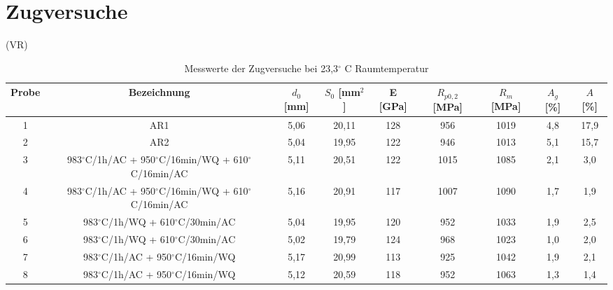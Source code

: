 \chapter{Zugversuche }

(VR)




\begin{table}
	\centering
	\begin{tabular}{|c|c|c|c|c|c|c|c|c|}
		\hline
		Probe & Bezeichnung & $d_0$ [mm] & $S_0$ [mm$^2$] & E [GPa] & $R_{p0,2}$ [MPa]& $R_m$ [MPa]& $A_g$ [\%]& $A$ [\%]\\
		\hline
		1 & AR1 & 5,06 & 20,11 & 128 & 956 & 1019&4,8&17,9 \\
		\hline
		2 & AR2&5,04&19,95&122&946&1013&5,1&15,7\\
		\hline
		3 & 983$^\circ$C/1h/AC + 950$^\circ$C/16min/WQ + 610$^\circ$C/16min/AC& 5,11&20,51& 122&1015&1085&2,1&3,0\\
		\hline
		4 & 983$^\circ$C/1h/AC + 950$^\circ$C/16min/WQ + 610$^\circ$C/16min/AC&5,16& 20,91& 117 & 1007& 1090& 1,7&  1,9 \\
		\hline
		5 & 983$^\circ$C/1h/WQ + 610$^\circ$C/30min/AC&5,04 &19,95& 120& 952& 1033& 1,9 &2,5\\
		\hline
		6 & 983$^\circ$C/1h/WQ + 610$^\circ$C/30min/AC&5,02& 19,79& 124& 968& 1023 &1,0 & 2,0\\
		\hline
		7 & 983$^\circ$C/1h/AC + 950$^\circ$C/16min/WQ&5,17& 20,99& 113& 925& 1042& 1,9& 2,1\\
		\hline
		8 & 983$^\circ$C/1h/AC + 950$^\circ$C/16min/WQ & 5,12 & 20,59 & 118 & 952 & 1063 & 1,3 & 1,4\\
		\hline
	\end{tabular}
	\label{tab:zugversuche}
	\caption{Messwerte der Zugversuche bei 23,3$^\circ$ C Raumtemperatur}
\end{table}

